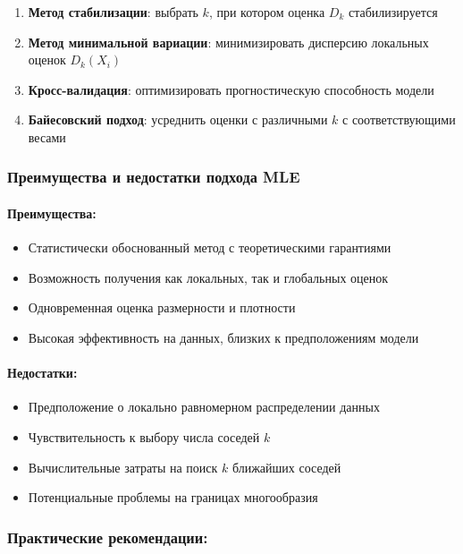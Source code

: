 \documentclass[a4paper,12pt]{article}
\begin{document}
\begin{enumerate}
    \item \textbf{Метод стабилизации}: выбрать $k$, при котором оценка $D_k$ стабилизируется

    \item \textbf{Метод минимальной вариации}: минимизировать дисперсию локальных оценок $D_k(X_i)$

    \item \textbf{Кросс-валидация}: оптимизировать прогностическую способность модели

    \item \textbf{Байесовский подход}: усреднить оценки с различными $k$ с соответствующими весами
\end{enumerate}

\subsubsection{Преимущества и недостатки подхода MLE}

\paragraph{Преимущества:}
\begin{itemize}
    \item Статистически обоснованный метод с теоретическими гарантиями
    \item Возможность получения как локальных, так и глобальных оценок
    \item Одновременная оценка размерности и плотности
    \item Высокая эффективность на данных, близких к предположениям модели
\end{itemize}

\paragraph{Недостатки:}
\begin{itemize}
    \item Предположение о локально равномерном распределении данных
    \item Чувствительность к выбору числа соседей $k$
    \item Вычислительные затраты на поиск $k$ ближайших соседей
    \item Потенциальные проблемы на границах многообразия
\end{itemize}

\subsubsection{Практические рекомендации:}
\end{document}
